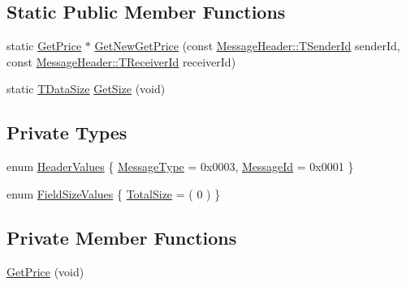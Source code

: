 \subsection*{Static Public Member Functions}
\begin{DoxyCompactItemize}
\item 
static \hyperlink{class_terra_swarm_1_1_synchronous_1_1_get_price}{Get\-Price} $\ast$ \hyperlink{class_terra_swarm_1_1_synchronous_1_1_get_price_a989d177a7d82912fb902f99304f84433}{Get\-New\-Get\-Price} (const \hyperlink{class_terra_swarm_1_1_message_header_a516b36855e2aad7cfbf8770f1b42784f}{Message\-Header\-::\-T\-Sender\-Id} sender\-Id, const \hyperlink{class_terra_swarm_1_1_message_header_aa3260702b182b6f88ddbdd3416e98df0}{Message\-Header\-::\-T\-Receiver\-Id} receiver\-Id)
\item 
static \hyperlink{namespace_terra_swarm_a092e6ec9739175076ae3106783f5c1b6}{T\-Data\-Size} \hyperlink{class_terra_swarm_1_1_synchronous_1_1_get_price_a424d231d9de597d35ffc1359bdcea4b2}{Get\-Size} (void)
\end{DoxyCompactItemize}
\subsection*{Private Types}
\begin{DoxyCompactItemize}
\item 
enum \hyperlink{class_terra_swarm_1_1_synchronous_1_1_get_price_a753a713a664ad54645f58aa349d74017}{Header\-Values} \{ \hyperlink{class_terra_swarm_1_1_synchronous_1_1_get_price_a753a713a664ad54645f58aa349d74017a08ca4ff2a63b1d19e7ac3fc9dbc247fb}{Message\-Type} = 0x0003, 
\hyperlink{class_terra_swarm_1_1_synchronous_1_1_get_price_a753a713a664ad54645f58aa349d74017a2719f42b8dc56e4b37b8e0a3d63936e8}{Message\-Id} = 0x0001
 \}
\item 
enum \hyperlink{class_terra_swarm_1_1_synchronous_1_1_get_price_ac675c3af37b1b76c0af699178c4fbe06}{Field\-Size\-Values} \{ \hyperlink{class_terra_swarm_1_1_synchronous_1_1_get_price_ac675c3af37b1b76c0af699178c4fbe06a6bd2ff634603aa756193e870db6762d7}{Total\-Size} = ( 0 )
 \}
\end{DoxyCompactItemize}
\subsection*{Private Member Functions}
\begin{DoxyCompactItemize}
\item 
\hyperlink{class_terra_swarm_1_1_synchronous_1_1_get_price_ab0eb094bba4cdd8d67b93373db2fa2a6}{Get\-Price} (void)
\end{DoxyCompactItemize}


